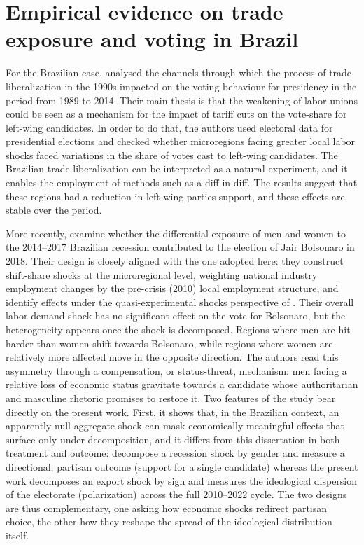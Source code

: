 \documentclass[
	11pt,				%
	oneside,			%
	a4paper,			%
	english,			%
	english				%
	]{abntex2ppgsi}
\theoremstyle{plain}
\theoremstyle{remark}
\theoremstyle{plain}%
\theoremstyle{remark}%
\begin{document}
\section{Empirical evidence on trade exposure and voting in Brazil}

For the Brazilian case,  analysed the channels through which the process of trade liberalization in the 1990s impacted on the voting behaviour for presidency in the period from 1989 to 2014. Their main thesis is that the weakening of labor unions could be seen as a mechanism for the impact of tariff cuts on the vote-share for left-wing candidates. In order to do that, the authors used electoral data for presidential elections and checked whether microregions facing greater local labor shocks faced variations in the share of votes cast to left-wing candidates. The Brazilian trade liberalization can be interpreted as a natural experiment, and it enables the employment of methods such as a diff-in-diff. The results suggest that these regions had a reduction in left-wing parties support, and these effects are stable over the period. 

More recently,  examine whether the differential
exposure of men and women to the 2014--2017 Brazilian recession contributed to
the election of Jair Bolsonaro in 2018. Their design is closely aligned with the one adopted here: they construct shift-share shocks at the
microregional level, weighting national industry employment changes by the
pre-crisis (2010) local employment structure, and identify effects under the
quasi-experimental shocks perspective of . Their
overall labor-demand shock has no significant effect on
the vote for Bolsonaro, but the
heterogeneity appears once the shock is decomposed. Regions where men are hit harder
than women shift towards Bolsonaro, while regions where women are relatively more
affected move in the opposite direction. The authors read this asymmetry through a
compensation, or status-threat, mechanism: men facing a relative loss of
economic status gravitate towards a candidate whose authoritarian and masculine
rhetoric promises to restore it. Two features of the study bear directly on the
present work. First, it shows that, in the Brazilian context, an apparently null
aggregate shock can mask economically meaningful effects that surface only under
decomposition, and it differs from this dissertation in
both treatment and outcome:  decompose a recession shock
by gender and measure a directional, partisan outcome (support for a single
candidate) whereas the present work decomposes an export shock by sign and
measures the ideological dispersion of the electorate (polarization) across the
full 2010--2022 cycle. The two designs are thus complementary, one asking how
economic shocks redirect partisan choice, the other how they reshape the spread
of the ideological distribution itself.
\end{document}
